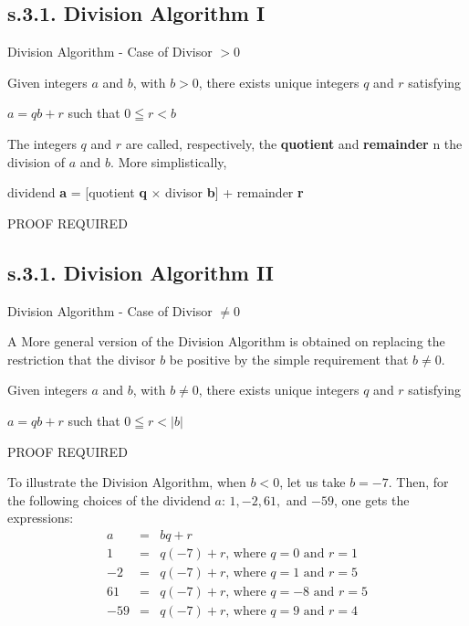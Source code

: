 \newpage
\subsection{s.3.1. Division Algorithm I}
\begin{definition}
Division Algorithm - Case of Divisor $> 0$

Given integers $a$ and $b$, with $b>0$, there exists unique integers $q$ and $r$ satisfying 
\begin{tcolorbox}
	\begin{theorem}
		$a = qb + r$ such that $0 \leqq r < b$
	\end{theorem}
\end{tcolorbox}
The integers $q$ and $r$ are called, respectively, the {\bf quotient} and {\bf remainder} n the division of $a$ and $b$. More simplistically, 
	\begin{center}
		dividend {\bf a} = [quotient {\bf q} $\times$ divisor {\bf b}] + remainder {\bf r}	
	\end{center}
PROOF REQUIRED
\end{definition} 



\subsection{s.3.1. Division Algorithm II}
\begin{definition}
Division Algorithm - Case of Divisor $ \neq 0$

A More general version of the Division Algorithm is obtained on replacing the restriction that the divisor $b$ be positive by the simple requirement that $b \neq 0$. 

Given integers $a$ and $b$, with $b \neq 0$, there exists unique integers $q$ and $r$ satisfying 
\begin{tcolorbox}
	\begin{theorem}
		$a = qb + r$ such that $0 \leqq r < |b|$
	\end{theorem} 
\end{tcolorbox}
PROOF REQUIRED


To illustrate the Division Algorithm, when $b < 0$, let us take $b=-7$. Then, for the following choices of the dividend $a$: $1,-2,61,$ and $-59$, one gets the expressions:
	\begin{eqnarray*}
		a & = & bq + r \nonumber \\		
		1 & = & q(-7) + r \text{, where }q=0 \text{ and } r=1  \nonumber \\	
		-2 & = & q(-7) + r \text{, where }q=1 \text{ and } r=5  \nonumber \\	
		61 & = & q(-7) + r \text{, where }q=-8 \text{ and } r=5  \nonumber \\	
		-59 & = & q(-7) + r \text{, where }q=9 \text{ and } r=4  \nonumber \\	
	\end{eqnarray*}
\end{definition} 




